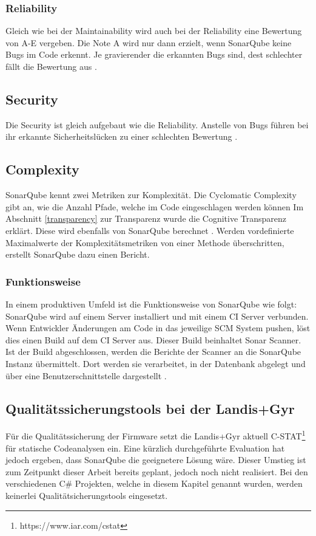 \subsubsection{Reliability}
Gleich wie bei der Maintainability wird auch bei der Reliability eine Bewertung von A-E vergeben.
Die Note A wird nur dann erzielt, wenn SonarQube keine Bugs im Code erkennt.
Je gravierender die erkannten Bugs sind, dest schlechter fällt die Bewertung aus \parencite{sonarQubeMetrics}.

\subsection{Security}
Die Security ist gleich aufgebaut wie die Reliability.
Anstelle von Bugs führen bei ihr erkannte Sicherheitslücken zu einer schlechten Bewertung \parencite{sonarQubeMetrics}.

\subsection{Complexity}
SonarQube kennt zwei Metriken zur Komplexität.
Die Cyclomatic Complexity gibt an, wie die Anzahl Pfade, welche im Code eingeschlagen werden können
Im Abschnitt \ref{transparency} zur Transparenz wurde die Cognitive Transparenz erklärt. 
Diese wird ebenfalls von SonarQube berechnet \parencite{sonarQubeMetrics}.
Werden vordefinierte Maximalwerte der Komplexitätsmetriken von einer Methode überschritten, erstellt SonarQube dazu einen Bericht.


\subsubsection{Funktionsweise}\label{sonar:funktionsweise}
In einem produktiven Umfeld ist die Funktionsweise von SonarQube wie folgt:
SonarQube wird auf einem Server installiert und mit einem \ac{CI} Server verbunden.
Wenn Entwickler Änderungen am Code in das jeweilige \ac{SCM} System pushen, löst dies einen Build auf dem \ac{CI} Server aus.
Dieser Build beinhaltet Sonar Scanner.
Ist der Build abgeschlossen, werden die Berichte der Scanner an die SonarQube Instanz übermittelt.
Dort werden sie verarbeitet, in der Datenbank abgelegt und über eine Benutzerschnittstelle dargestellt \parencite{malloy_2021}.

\subsection{Qualitätssicherungstools bei der Landis+Gyr}
Für die Qualitätssicherung der Firmware setzt die Landis+Gyr aktuell C-STAT\footnote{https://www.iar.com/cstat} für statische Codeanalysen ein.
Eine kürzlich durchgeführte Evaluation hat jedoch ergeben, dass SonarQube die geeignetere Lösung wäre.
Dieser Umstieg ist zum Zeitpunkt dieser Arbeit bereits geplant, jedoch noch nicht realisiert.
Bei den verschiedenen C\# Projekten, welche in diesem Kapitel genannt wurden, werden keinerlei Qualitätsicherungstools eingesetzt.
